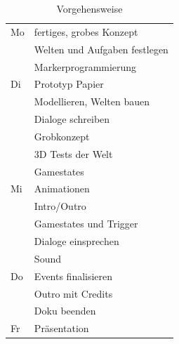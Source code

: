 \begin{table}[!htbp]
\begin{center}
\begin{tabular}[hc]{l|l}
\hline
Mo & fertiges, grobes Konzept\\
& Welten und Aufgaben festlegen\\
& Markerprogrammierung\\
\hline
Di & Prototyp Papier\\
& Modellieren, Welten bauen\\
& Dialoge schreiben\\
& Grobkonzept\\
& 3D Tests der Welt\\
& Gamestates\\
\hline
Mi & Animationen\\
& Intro/Outro\\
& Gamestates und Trigger\\
& Dialoge einsprechen\\
& Sound\\
\hline
Do & Events finalisieren\\
& Outro mit Credits\\
& Doku beenden\\
\hline
Fr & Präsentation\\
\end{tabular}
\caption{Vorgehensweise}
\label{tab:Vorgehensweise}
\end{center}
\end{table}